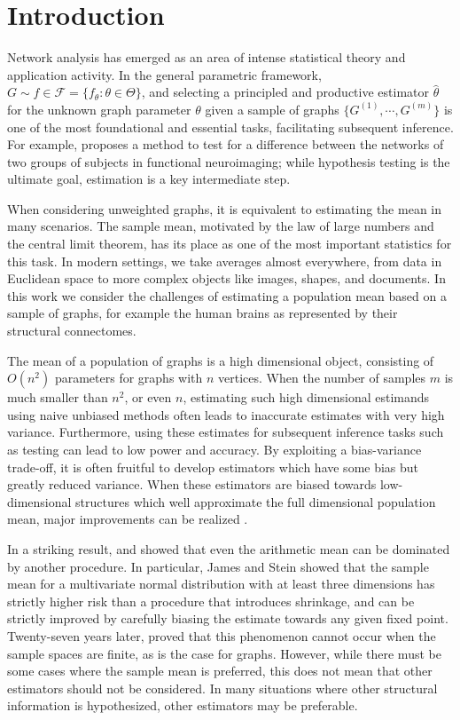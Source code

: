 
\chapter{Introduction}
\label{chap:intro}

Network analysis has emerged as an area of intense statistical theory and application activity.
In the general parametric framework, $G \sim f \in \mathcal{F} = \{f_{\theta} : \theta \in \Theta \}$, and selecting a principled and productive estimator $\hat{\theta}$ for the unknown graph parameter $\theta$ given a sample of graphs $\{G^{(1)}, \cdots, G^{(m)}\}$ is one of the most foundational and essential tasks, facilitating subsequent inference.
For example, \citet{ginestet2014hypothesis} proposes a method to test for a difference between the networks of two groups of subjects in functional neuroimaging; while hypothesis testing is the ultimate goal, estimation is a key intermediate step.


When considering unweighted graphs, it is equivalent to estimating the mean in many scenarios.
The sample mean, motivated by the law of large numbers and the central limit theorem, has its place as one of the most important statistics for this task.
In modern settings, we take averages almost everywhere, from data in Euclidean space to more complex objects like images, shapes, and documents.
In this work we consider the challenges of estimating a population mean based on a sample of graphs, for example the human brains as represented by their structural connectomes. 

The mean of a population of graphs is a high dimensional object, consisting of $O(n^2)$ parameters for graphs with $n$ vertices.
When the number of samples $m$ is much smaller than $n^2$, or even $n$, estimating such high dimensional estimands using naive unbiased methods often leads to inaccurate estimates with very high variance.
Furthermore, using these estimates for subsequent inference tasks such as testing can lead to low power and accuracy.
By exploiting a bias-variance trade-off, it is often fruitful to develop estimators which have some bias but greatly reduced variance.
When these estimators are biased towards low-dimensional structures which well approximate the full dimensional population mean, major improvements can be realized \citep{trunk1979problem}.

In a striking result, \citet{stein1956inadmissibility} and \citet{james1961estimation} showed that even the arithmetic mean can be dominated by another procedure.
In particular, James and Stein showed that the sample mean for a multivariate normal distribution with at least three dimensions has strictly higher risk than a procedure that introduces shrinkage, and can be strictly improved by carefully biasing the  estimate towards any given fixed point. 
Twenty-seven years later, \citet{gutmann1982stein} proved that this phenomenon cannot occur when the sample spaces are finite, as is the case for graphs.
However, while there must be some cases where the sample mean is preferred, this does not mean that other estimators should not be considered.
In many situations where other structural information is hypothesized, other estimators may be preferable.

